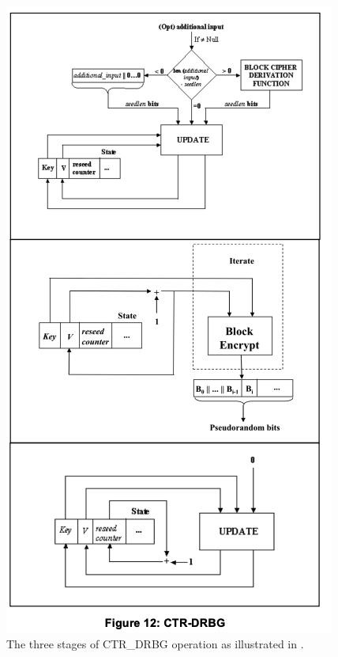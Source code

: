 \begin{figure}[htbp]
    \centering
    \includegraphics[width=0.9\linewidth]{images/Figure12_CTR_DRBG.png}
    \caption{The three stages of CTR\_DRBG operation as illustrated in \cite{nist80090a}.}
    \label{fig:ctr_drbg_stages}
\end{figure}

